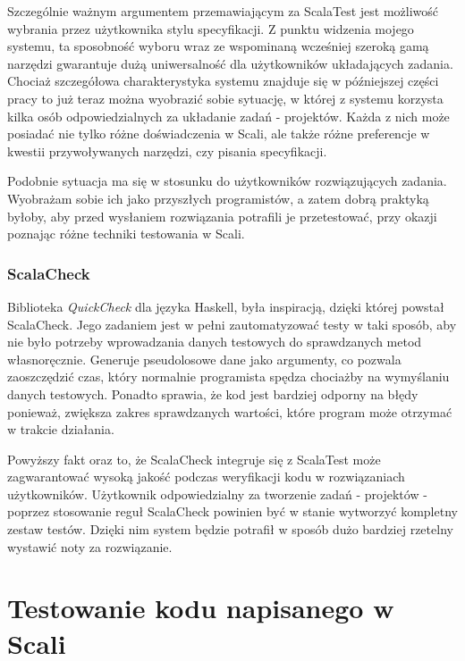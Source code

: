 \documentclass[brudnopis]{xmgr}
\begin{document}
Szczególnie ważnym argumentem przemawiającym za ScalaTest jest możliwość wybrania przez użytkownika stylu specyfikacji. Z punktu widzenia mojego systemu, ta sposobność wyboru wraz ze wspominaną wcześniej szeroką gamą narzędzi gwarantuje dużą uniwersalność dla użytkowników układających zadania. Chociaż szczegółowa charakterystyka systemu znajduje się w późniejszej części pracy to już teraz można wyobrazić sobie sytuację, w której z systemu korzysta kilka osób odpowiedzialnych za układanie zadań - projektów. Każda z nich może posiadać nie tylko różne doświadczenia w Scali, ale także różne preferencje w kwestii przywoływanych narzędzi, czy pisania specyfikacji. 

Podobnie sytuacja ma się w stosunku do użytkowników rozwiązujących zadania. Wyobrażam sobie ich jako przyszłych programistów, a zatem dobrą praktyką byłoby, aby przed wysłaniem rozwiązania potrafili je przetestować, przy okazji poznając różne techniki testowania w Scali. 

\subsection{ScalaCheck}

\label{scalaCheckSrodek}

Biblioteka \emph{QuickCheck} dla języka Haskell, była inspiracją, dzięki której powstał ScalaCheck. Jego zadaniem jest w pełni zautomatyzować testy w taki sposób, aby nie było potrzeby wprowadzania danych testowych do sprawdzanych metod własnoręcznie. Generuje pseudolosowe dane jako argumenty, co pozwala zaoszczędzić czas, który normalnie programista spędza chociażby na wymyślaniu danych testowych. Ponadto sprawia, że kod jest bardziej odporny na błędy ponieważ, zwiększa zakres sprawdzanych wartości, które program może otrzymać w trakcie działania.

Powyższy fakt oraz to, że ScalaCheck integruje się z ScalaTest może zagwarantować wysoką jakość podczas weryfikacji kodu w rozwiązaniach użytkowników. Użytkownik odpowiedzialny za tworzenie zadań - projektów - poprzez stosowanie reguł ScalaCheck powinien być w stanie wytworzyć kompletny zestaw testów. Dzięki nim system będzie potrafił w sposób dużo bardziej rzetelny wystawić noty za rozwiązanie.
      
\chapter{Testowanie kodu napisanego w Scali}      
\end{document}
